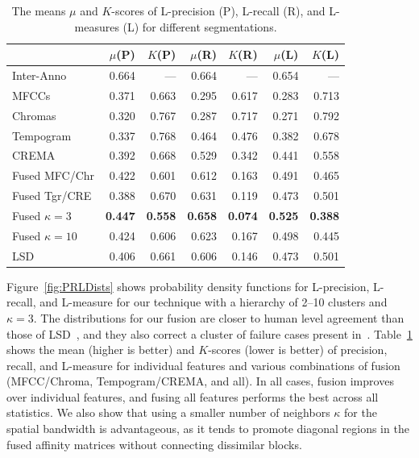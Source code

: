 \documentclass{article}
\begin{document}
\begin{table}\label{tab:salami}
\footnotesize
\begin{tabular}{lrrrrrr}
    \toprule
{} &  $\mu$(P) &  $K$(P) &  $\mu$(R) &  $K$(R) &  $\mu$(L) &  $K$(L) \\
\midrule
Inter-Anno         &           0.664 &      ---      &        0.664 &       ---   &         0.654 &         ---\\
\midrule
MFCCs             &           0.371 &         0.663 &        0.295 &      0.617 &         0.283 &       0.713 \\
Chromas           &            0.320 &         0.767 &        0.287 &      0.717 &         0.271 &       0.792 \\
Tempogram         &           0.337 &         0.768 &        0.464 &      0.476 &         0.382 &       0.678 \\
CREMA             &           0.392 &         0.668 &        0.529 &      0.342 &         0.441 &       0.558 \\
Fused MFC/Chr &           0.422 &         0.601 &        0.612 &      0.163 &         0.491 &       0.465 \\
Fused Tgr/CRE &           0.388 &          0.670 &        0.631 &      0.119 &         0.473 &       0.501 \\
Fused $\kappa=3$             &           \textbf{0.447} &         \textbf{0.558} &        \textbf{0.658} &     \textbf{0.074} &         \textbf{0.525} &       \textbf{0.388} \\
Fused $\kappa=10$      &           0.424 &         0.606 &        0.623 &      0.167 &         0.498 &       0.445 \\

LSD\cite{mcfee2014spectral}          &           0.406 &         0.661 &        0.606 &      0.146 &         0.473 &       0.501 \\
\bottomrule
\end{tabular}
\caption{The means $\mu$ and $K$-scores of L-precision (P), L-recall (R), and L-measures (L) for different segmentations.}
\end{table}



Figure~\ref{fig:PRLDists} shows probability density functions for L-precision, L-recall, and L-measure for our technique with a hierarchy of 2--10 clusters and $\kappa=3$.  The distributions for our fusion are closer to human level agreement than those of LSD~\cite{mcfee2014spectral}, and they also correct a cluster of failure cases present in~\cite{mcfee2014spectral}.  Table~\ref{tab:salami} shows the mean (higher is better) and $K$-scores (lower is better) of precision, recall, and L-measure for individual features and various combinations of fusion (MFCC/Chroma, Tempogram/CREMA, and all).  In all cases, fusion improves over individual features, and fusing all features performs the best across all statistics.  We also show that using a smaller number of neighbors $\kappa$ for the spatial bandwidth is advantageous, as it tends to promote diagonal regions in the fused affinity matrices without connecting dissimilar blocks.
\end{document}
